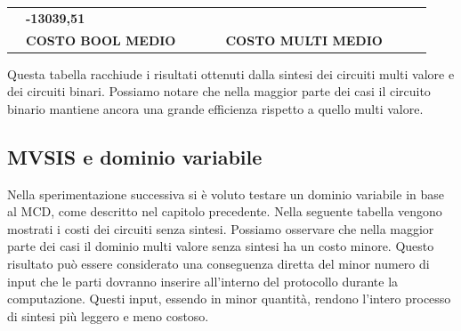 \documentclass[
]{book}
\begin{document}
\begin{longtable}[]{@{}lllllllll@{}}
\begin{minipage}[t]{0.07\columnwidth}
\end{minipage} & \begin{minipage}[t]{0.07\columnwidth}\raggedright
\textbf{-13039,51}\strut
\end{minipage}\tabularnewline
\begin{minipage}[t]{0.07\columnwidth}\raggedright
\strut
\end{minipage} & \begin{minipage}[t]{0.11\columnwidth}\raggedright
\textbf{COSTO BOOL MEDIO}\strut
\end{minipage} & \begin{minipage}[t]{0.08\columnwidth}\raggedright
\strut
\end{minipage} & \begin{minipage}[t]{0.07\columnwidth}\raggedright
\strut
\end{minipage} & \begin{minipage}[t]{0.09\columnwidth}\raggedright
\strut
\end{minipage} & \begin{minipage}[t]{0.12\columnwidth}\raggedright
\textbf{COSTO MULTI MEDIO}\strut
\end{minipage} & \begin{minipage}[t]{0.08\columnwidth}\raggedright
\strut
\end{minipage} & \begin{minipage}[t]{0.07\columnwidth}\raggedright
\strut
\end{minipage} & \begin{minipage}[t]{0.07\columnwidth}\raggedright
\strut
\end{minipage}\tabularnewline
\bottomrule
\end{longtable}

Questa tabella racchiude i risultati ottenuti dalla sintesi dei circuiti multi valore e dei circuiti binari. Possiamo notare che nella maggior parte dei casi il circuito binario mantiene ancora una grande efficienza rispetto a quello multi valore.

\hypertarget{mvsis-e-dominio-variabile}{%
\subsection{MVSIS e dominio variabile}\label{mvsis-e-dominio-variabile}}

Nella sperimentazione successiva si è voluto testare un dominio variabile in base al MCD, come descritto nel capitolo precedente. Nella seguente tabella vengono mostrati i costi dei circuiti senza sintesi. Possiamo osservare che nella maggior parte dei casi il dominio multi valore senza sintesi ha un costo minore. Questo risultato può essere considerato una conseguenza diretta del minor numero di input che le parti dovranno inserire all'interno del protocollo durante la computazione. Questi input, essendo in minor quantità, rendono l'intero processo di sintesi più leggero e meno costoso.
\end{document}
